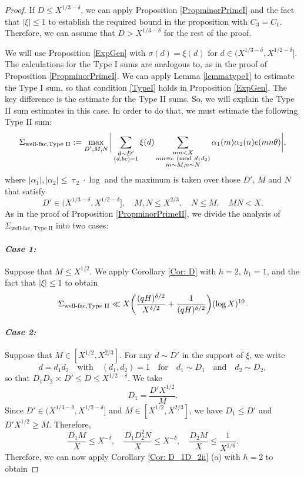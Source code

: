 \documentclass[12pt]{amsart}
\numberwithin{equation}{section}
\theoremstyle{remark}
\theoremstyle{definition}
\newcommand{\imod}[1]{\ (\mathrm{mod}\ #1)}
\begin{document}
\begin{proof}
If $D\leq X^{1/3-\delta}$, we can apply Proposition \ref{PropminorPrimeI} and the fact that $|\xi|\leq 1$ to establish the required bound in the proposition with $C_3=C_1$. Therefore, we can assume that $D>X^{1/3-\delta}$ for the rest of the proof.

We will use Proposition \ref{ExpGen} with ${\sigma}(d)=\xi(d)$ for $d\in (X^{1/3-\delta}, X^{1/2-\delta}]$.
The calculations for the Type I sums are analogous to, as in the proof of Proposition \ref{PropminorPrimeI}. We can apply Lemma \ref{lemmatype1} to estimate the Type I sum, so that condition \ref{TypeI} holds in Proposition \ref{ExpGen}. The key difference is the estimate for the Type II sums. So, we will explain the Type II sum estimates in this case.
In order to do that, we must estimate the following Type II sum:
\begin{align}\notag 
\Sigma_{\text{well-fac,Type II}}:=\max_{\substack{D', M, N}}\bigg|\sum_{\substack{d\sim D'\\(d, bc)=1}}\xi(d)\sum_{\substack{mn<X\\mn\equiv c\imod {d_1d_2}\\m\sim M, n\sim N}}{\alpha}_1(m){\alpha}_2(n)e(mn\theta)\bigg|,
\end{align}
where $|{\alpha}_1|, |{\alpha}_2|\leq \uptau_2\cdot\log$ and the maximum is taken over those $D'$, $M$ and $N$ that satisfy
\[D'\in (X^{1/3-\delta}, X^{1/2-\delta}], \quad M, N\leq X^{2/3},\quad N\leq M, \quad  MN<X.\]
 As in the proof of Proposition \ref{PropminorPrimeII}, we divide the analysis of $\Sigma_{\text{well-fac, Type II}}$ into two cases:

\paragraph{\it Case 1:} Suppose that $M\leq X^{1/2}$. We apply Corollary \ref{Cor: D} with $h=2$, $h_1=1$, and the fact that $|\xi|\leq 1$ to obtain
\begin{align}\notag 
\Sigma_{\text{well-fac,Type II}} \ll X\bigg(\dfrac{(qH)^{\delta/2}}{X^{\delta/2}} + \dfrac{1}{(qH)^{\delta/2}}\bigg)(\log X)^{10}.
\end{align}

\paragraph{\it Case 2:} Suppose that $M\in [X^{1/2}, X^{2/3}]$. For any $d\sim D'$ in the support of $\xi$, we write
\[d=d_1d_2 \quad  \text{with}\quad (d_1, d_2)=1 \quad \text{for}\quad d_1\sim D_1\quad \text{and} \quad d_2\sim D_2,\]
 so that $D_1D_2\asymp D' \leq D\leq  X^{1/2-\delta}$. We take
 \[D_1=\dfrac{D'X^{1/2}}{M}.\]
Since $D'\in (X^{1/3-\delta}, X^{1/2-\delta}]$ and $M\in [X^{1/2}, X^{2/3}]$, we have $D_1\leq D'$ and $D'X^{1/2}\geq M$. Therefore,
\[\dfrac{D_1M}{X}\leq X^{-\delta},\quad \dfrac{D_1D_2^2N}{X}\leq X^{-\delta}, \quad \dfrac{D_2M}{X} \leq \dfrac{1}{X^{1/6}}.\]
Therefore, we can now apply Corollary \ref{Cor: D_1D_2ii} (a) with $h=2$ to obtain


\end{proof}
\end{document}
